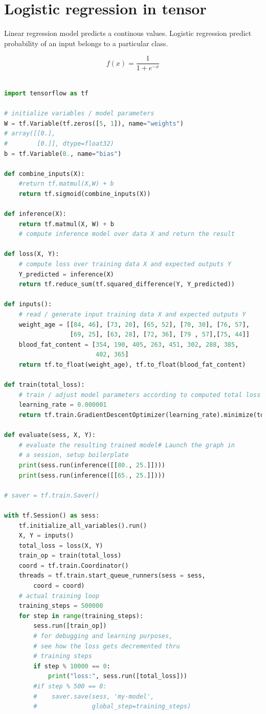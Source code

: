 \documentclass[vecarrow]{svproc}
\begin{document}
\section{Logistic regression in tensor}

Linear regression model predicts a continous values. Logistic regression predict
probability of an input belongs to a particular class.

\begin{equation}
  f(x) = \frac{1}{1 + e^{-x}}
\end{equation}

\begin{lstlisting}[language=Python,
caption={logistic regression in tensor},label={list8}]

import tensorflow as tf

# initialize variables / model parameters
W = tf.Variable(tf.zeros([5, 1]), name="weights")
# array([[0.],
#        [0.]], dtype=float32)
b = tf.Variable(0., name="bias")

def combine_inputs(X):
    #return tf.matmul(X,W) + b
    return tf.sigmoid(combine_inputs(X))

def inference(X):
    return tf.matmul(X, W) + b
    # compute inference model over data X and return the result

def loss(X, Y):
    # compute loss over training data X and expected outputs Y
    Y_predicted = inference(X)
    return tf.reduce_sum(tf.squared_difference(Y, Y_predicted))

def inputs():
    # read / generate input training data X and expected outputs Y
    weight_age = [[84, 46], [73, 20], [65, 52], [70, 30], [76, 57],
                  [69, 25], [63, 28], [72, 36], [79 , 57],[75, 44]]
    blood_fat_content = [354, 190, 405, 263, 451, 302, 288, 385,
                         402, 365]
    return tf.to_float(weight_age), tf.to_float(blood_fat_content)

def train(total_loss):
    # train / adjust model parameters according to computed total loss
    learning_rate = 0.000001
    return tf.train.GradientDescentOptimizer(learning_rate).minimize(total_loss)

def evaluate(sess, X, Y):
    # evaluate the resulting trained model# Launch the graph in
    # a session, setup boilerplate
    print(sess.run(inference([[80., 25.]])))
    print(sess.run(inference([[65., 25.]])))

# saver = tf.train.Saver()

with tf.Session() as sess:
    tf.initialize_all_variables().run()
    X, Y = inputs()
    total_loss = loss(X, Y)
    train_op = train(total_loss)
    coord = tf.train.Coordinator()
    threads = tf.train.start_queue_runners(sess = sess,
        coord = coord)
    # actual training loop
    training_steps = 500000
    for step in range(training_steps):
        sess.run([train_op])
        # for debugging and learning purposes,
        # see how the loss gets decremented thru
        # training steps
        if step % 10000 == 0:
            print("loss:", sess.run([total_loss]))
        #if step % 500 == 0:
        #    saver.save(sess, 'my-model',
        #               global_step=training_steps)


\end{lstlisting}
\end{document}

